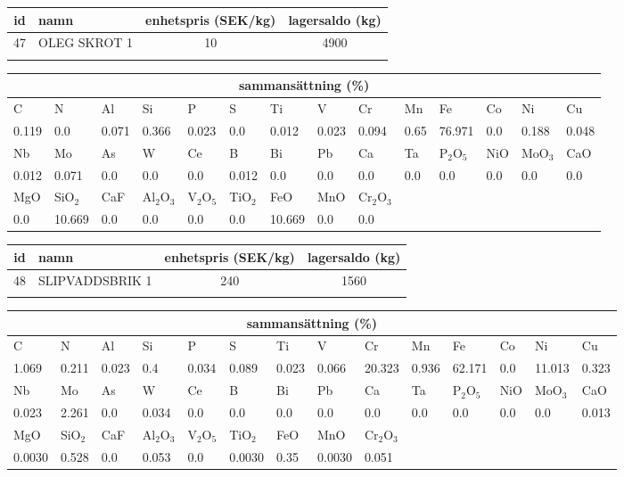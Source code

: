 \begin{center}
{\scriptsize\addtolength{\tabcolsep}{-3pt}
\begin{tabular}{clcc}
id&namn&enhetspris (SEK/kg)&lagersaldo (kg)\\
\hline
47&OLEG SKROT 1&10&4900\\\\
\end{tabular}
\begin{tabular}{llllllllllllll}
\multicolumn{14}{c}{sammansättning (\%)}\\
\hline
C&N&Al&Si&P&S&Ti&V&Cr&Mn&Fe&Co&Ni&Cu\\
\hline
0.119&0.0&0.071&0.366& 0.023&0.0&0.012&0.023& 0.094&0.65&76.971&0.0& 0.188&0.048\\
\hline
Nb&Mo&As&W&Ce&B&Bi&Pb&Ca&Ta&P$_2$O$_5$&NiO&MoO$_3$&CaO\\
\hline
0.012& 0.071& 0.0& 0.0& 0.0& 0.012& 0.0& 0.0& 0.0& 0.0& 0.0& 0.0& 0.0& 0.0\\
\hline
MgO&SiO$_2$&CaF&Al$_2$O$_3$&V$_2$O$_5$&TiO$_2$&FeO&MnO&Cr$_2$O$_3$\\
\hline
0.0& 10.669& 0.0& 0.0& 0.0& 0.0& 10.669& 0.0& 0.0\\
\end{tabular}
}
\end{center}

\begin{center}
{\scriptsize\addtolength{\tabcolsep}{-3pt}
\begin{tabular}{clcc}
id&namn&enhetspris (SEK/kg)&lagersaldo (kg)\\
\hline
48&SLIPVADDSBRIK 1&240&1560\\\\
\end{tabular}
\begin{tabular}{llllllllllllll}
\multicolumn{14}{c}{sammansättning (\%)}\\
\hline
C&N&Al&Si&P&S&Ti&V&Cr&Mn&Fe&Co&Ni&Cu\\
\hline
1.069&0.211&0.023&0.4& 0.034&0.089&0.023&0.066& 20.323&0.936&62.171&0.0& 11.013&0.323\\
\hline
Nb&Mo&As&W&Ce&B&Bi&Pb&Ca&Ta&P$_2$O$_5$&NiO&MoO$_3$&CaO\\
\hline
0.023& 2.261& 0.0& 0.034& 0.0& 0.0& 0.0& 0.0& 0.0& 0.0& 0.0& 0.0& 0.0& 0.013\\
\hline
MgO&SiO$_2$&CaF&Al$_2$O$_3$&V$_2$O$_5$&TiO$_2$&FeO&MnO&Cr$_2$O$_3$\\
\hline
0.0030& 0.528& 0.0& 0.053& 0.0& 0.0030& 0.35& 0.0030& 0.051\\
\end{tabular}
}
\end{center}
